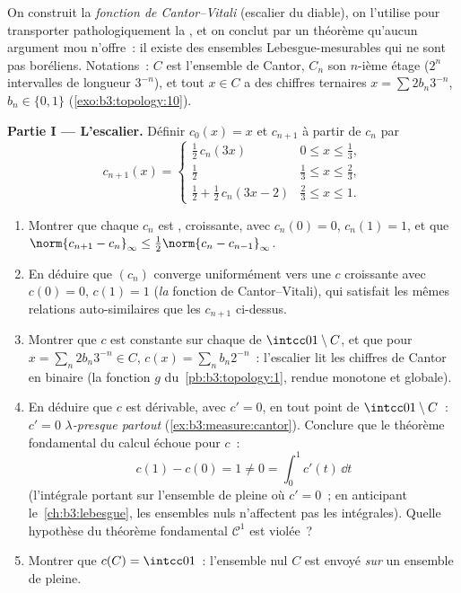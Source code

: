 \begin{problem}
\label{pb:b3:measure:1}
On construit la \emph{fonction de Cantor--Vitali} (escalier
du diable), on l'utilise pour transporter pathologiquement
la , et on conclut par un théorème qu'aucun argument
mou n'offre~: il existe des ensembles Lebesgue-mesurables
qui ne sont pas boréliens. Notations~: $C$ est l'ensemble de
Cantor, $C_n$ son $n$-ième étage ($2^n$ intervalles de
longueur $3^{-n}$), et tout $x \in C$ a des chiffres
ternaires $x = \sum 2b_n3^{-n}$, $b_n \in \{0,1\}$
(\cref{exo:b3:topology:10}).

\medskip
\noindent\textbf{Partie I --- L'escalier.} Définir $c_0(x) =
x$ et $c_{n+1}$ à partir de $c_n$ par
\[
c_{n+1}(x) = \begin{cases}
\tfrac12\,c_n(3x) & 0 \leq x \leq \tfrac13,\\[2pt]
\tfrac12 & \tfrac13 \leq x \leq \tfrac23,\\[2pt]
\tfrac12 + \tfrac12\,c_n(3x - 2) & \tfrac23 \leq x \leq 1.
\end{cases}
\]
\begin{enumerate}
  \item Montrer que chaque $c_n$ est , croissante, avec
        $c_n(0) = 0$, $c_n(1) = 1$, et que
        $\norm{c_{n+1} - c_n}_\infty \leq
        \tfrac12\norm{c_n - c_{n-1}}_\infty$.
  \item En déduire que $(c_n)$ converge uniformément vers une
        $c$  croissante avec $c(0) = 0$, $c(1) = 1$
        (\emph{la} fonction de Cantor--Vitali), qui satisfait
        les mêmes relations auto-similaires que les $c_{n+1}$
        ci-dessus.
  \item Montrer que $c$ est constante sur chaque  de $\intcc01\setminus C$, et que pour $x =
        \sum_n 2b_n3^{-n} \in C$, $c(x) = \sum_n b_n2^{-n}$~:
        l'escalier lit les chiffres de Cantor en binaire
        (la fonction $g$ du~\cref{pb:b3:topology:1}, rendue
        monotone et globale).
  \item En déduire que $c$ est dérivable, avec $c' = 0$, en
        tout point de $\intcc01\setminus C$~: $c' = 0$
        \emph{$\lambda$-presque partout}
        (\cref{ex:b3:measure:cantor}). Conclure que le
        théorème fondamental du calcul échoue pour $c$~:
        \[
        c(1) - c(0) = 1 \neq 0 = \int_0^1 c'(t)\,\dd t
        \]
        (l'intégrale portant sur l'ensemble de  pleine
        où $c' = 0$~; en anticipant le~\cref{ch:b3:lebesgue},
        les ensembles nuls n'affectent pas les intégrales).
        Quelle hypothèse du théorème fondamental $\mathcal
        C^1$ est violée~?
  \item Montrer que $c(C) = \intcc01$~: l'ensemble nul $C$ est
        envoyé \emph{sur} un ensemble de  pleine.
\end{enumerate}


\end{problem}
